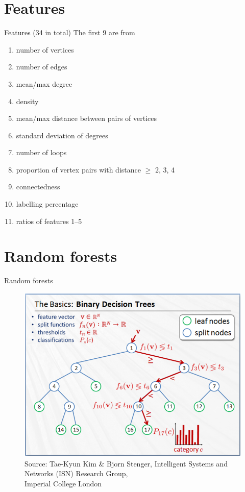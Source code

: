 \documentclass{beamer}
\begin{document}
\section{Features}
\begin{frame}{Features (34 in total)}
  The first 9 are from \cite{DBLP:conf/lion/KotthoffMS16}
  \begin{enumerate}
  \item number of vertices
  \item number of edges
  \item mean/max degree
  \item density
  \item mean/max distance between pairs of vertices
  \item standard deviation of degrees
  \item number of loops
  \item proportion of vertex pairs with distance $\ge$ 2, 3, 4
  \item connectedness
  \item labelling percentage
  \item ratios of features 1--5
  \end{enumerate}
\end{frame}

\section{Random forests}
\begin{frame}{Random forests} %
  \begin{figure}
    \centering
    \includegraphics[scale=0.5]{random_forests_2.png} \\
    {\tiny\color{gray}Source: Tae-Kyun Kim \& Bjorn Stenger, Intelligent Systems and Networks (ISN) Research Group,\\[-7pt] Imperial College London}
  \end{figure}
\end{frame}
\end{document}
